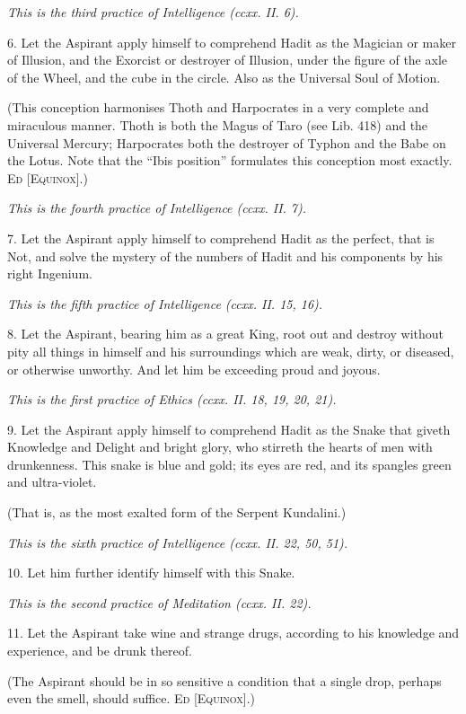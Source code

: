 \textit{This is the third practice of Intelligence (ccxx. II. 6).}

6. Let the Aspirant apply himself to comprehend Hadit as the Magician or maker of Illusion, and the Exorcist or destroyer of Illusion, under the figure of the axle of the Wheel, and the cube in the circle. Also as the Universal Soul of Motion.

(This conception harmonises Thoth and Harpocrates in a very complete and miraculous manner. Thoth is both the Magus of Taro (see Lib. 418) and the Universal Mercury; Harpocrates both the destroyer of Typhon and the Babe on the Lotus. Note that the \enquote{Ibis position} formulates this conception most exactly. \textsc{Ed [Equinox]}.)

\textit{This is the fourth practice of Intelligence (ccxx. II. 7).}

7. Let the Aspirant apply himself to comprehend Hadit as the perfect, that is Not, and solve the mystery of the numbers of Hadit and his components by his right Ingenium.

\textit{This is the fifth practice of Intelligence (ccxx. II. 15, 16).}

8. Let the Aspirant, bearing him as a great King, root out and destroy without pity all things in himself and his surroundings which are weak, dirty, or diseased, or otherwise unworthy. And let him be exceeding proud and joyous.

\textit{This is the first practice of Ethics (ccxx. II. 18, 19, 20, 21).}

9. Let the Aspirant apply himself to comprehend Hadit as the Snake that giveth Knowledge and Delight and bright glory, who stirreth the hearts of men with drunkenness. This snake is blue and gold; its eyes are red, and its spangles green and ultra-violet.

(That is, as the most exalted form of the Serpent Kundalini.)

\textit{This is the sixth practice of Intelligence (ccxx. II. 22, 50, 51).}

10. Let him further identify himself with this Snake.

\textit{This is the second practice of Meditation (ccxx. II. 22).}

11. Let the Aspirant take wine and strange drugs, according to his knowledge and experience, and be drunk thereof.

(The Aspirant should be in so sensitive a condition that a single drop, perhaps even the smell, should suffice. \textsc{Ed [Equinox]}.)

